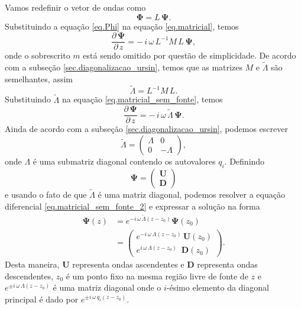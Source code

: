 Vamos redefinir o vetor de ondas como
\begin{equation}\label{eq.Phi}
\mathbf{\Phi}=L\,\mathbf{\Psi}.
\end{equation}
Substituindo a equa\c{c}\~ao \ref{eq.Phi} na equa\c{c}\~ao \ref{eq.matricial}, temos
\begin{equation}\label{eq.matricial_sem_fonte}
\frac{\partial\,\mathbf{\Psi}}{\partial\,z} =-\,i\,\omega\,L^{-1}M\,L\,\mathbf{\Psi},
\end{equation}
onde o sobrescrito $m$ est\'a sendo omitido por quest\~ao de simplicidade.
De acordo com a subse\c{c}\~ao \ref{sec.diagonalizacao_ursin}, temos que as matrizes $M$ e $\tilde{\Lambda}$ s\~ao semelhantes, assim
\begin{equation*}
\tilde{\Lambda}=L^{-1}M\,L.
\end{equation*}
Substituindo $\tilde{\Lambda}$ na equa\c{c}\~ao \ref{eq.matricial_sem_fonte}, temos
\begin{equation}\label{eq.matricial_sem_fonte_2}
\frac{\partial\,\mathbf{\Psi}}{\partial\,z} =-\,i\,\omega\,\tilde{\Lambda}\,\mathbf{\Psi}.
\end{equation}
Ainda de acordo com a subse\c{c}\~ao \ref{sec.diagonalizacao_ursin}, podemos escrever
\begin{equation}
\tilde{\Lambda}=
\begin{pmatrix}
\Lambda&0\\
0&-\Lambda
\end{pmatrix},
\end{equation}
onde $\Lambda$ \'e uma submatriz diagonal contendo os autovalores $q_i$.
Definindo
\begin{equation}\label{eq.definicao_psi}
\mathbf{\Psi}=
\begin{pmatrix}
\mathbf{U}\\
\mathbf{D}
\end{pmatrix}
\end{equation}
e usando o fato de que $\tilde{\Lambda}$ \'e uma matriz diagonal, podemos resolver a equa\c{c}\~ao diferencial \ref{eq.matricial_sem_fonte_2} e expressar a solu\c{c}\~ao na forma
\begin{align}\nonumber
\mathbf{\Psi}(z)&=e^{-i\,\omega\,\tilde{\Lambda}(z-z_0)}\mathbf{\Psi}(z_0)\\\label{eq.solucao_psi}
&=\begin{pmatrix}
e^{-i\,\omega\,\Lambda(z-z_0)}\,\mathbf{U}(z_0)\\
e^{i\,\omega\,\Lambda(z-z_0)}\,\,\,\mathbf{D}(z_0)
\end{pmatrix}.
\end{align}
Desta maneira, $\mathbf{U}$ representa ondas ascendentes e $\mathbf{D}$ representa ondas descendentes, $z_0$ \'e um ponto fixo na mesma regi\~ao livre de fonte de $z$ e $e^{\pm i\,\omega\,\Lambda(z-z_0)}$ \'e uma matriz diagonal onde o $i$-ésimo elemento da diagonal principal \'e dado por $e^{\pm i\,\omega\,q_i(z-z_0)}$. 

